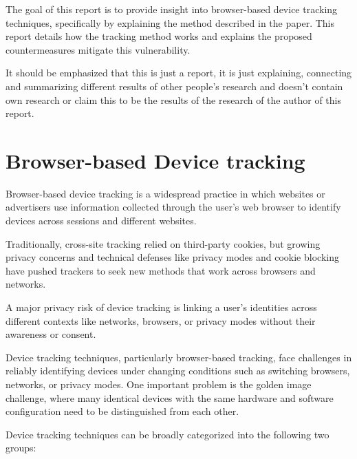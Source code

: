 \documentclass{report}
\begin{document}
The goal of this report is to provide insight into \alert{browser-based device tracking techniques}, specifically by explaining the method described in the paper\cite{kol2022devicetrackinglinuxsnew}. This report details \alert{how} the tracking method \alert{works} and explains the \alert{proposed countermeasures} mitigate this vulnerability.

\alert{It should be emphasized that this is just a report, it is just explaining, connecting and summarizing different results of other people's research and doesn't contain own research or claim this to be the results of the research of the author of this report}. 


\section{Browser-based Device tracking}
\label{sec:Online browser-based device tracking}

\alert{Browser-based device tracking} is a widespread practice in which websites or advertisers use information collected through the user’s web browser to identify devices across sessions and different websites.

Traditionally, cross-site tracking relied on \alert{third-party cookies}, but growing privacy concerns and technical defenses like privacy modes and cookie blocking have pushed trackers to seek new methods that work across browsers and networks.

A major \alert{privacy risk} of device tracking is linking a user’s identities across different contexts like networks, browsers, or privacy modes without their awareness or consent.


Device tracking techniques, particularly browser-based tracking, face challenges in reliably identifying devices under changing conditions such as switching browsers, networks, or privacy modes. One important problem is the \alert{golden image challenge}, where many identical devices with the same hardware and software configuration need to be distinguished from each other.  

Device tracking techniques can be broadly categorized into the following two groups:
\end{document}

